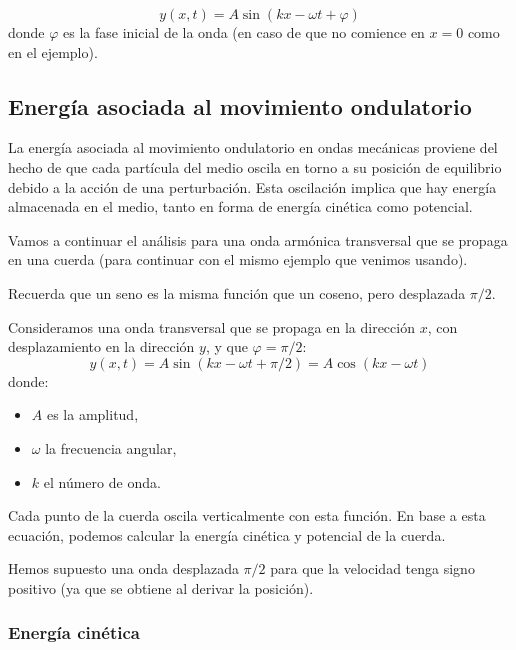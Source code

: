 \begin{equation}
  \boxed{y(x,t) = A \sin(kx - \omega t + \varphi)}
\end{equation}
donde \(\varphi\) es la fase inicial de la onda (en caso de que no comience en \(x=0\) como en el ejemplo).

\subsection{Energía asociada al movimiento ondulatorio}

La energía asociada al movimiento ondulatorio en ondas mecánicas proviene del hecho de que cada partícula del medio oscila en torno a su posición de equilibrio debido a la acción de una perturbación. Esta oscilación implica que hay energía almacenada en el medio, tanto en forma de energía cinética como potencial.

Vamos a continuar el análisis para una onda armónica transversal que se propaga en una cuerda (para continuar con el mismo ejemplo que venimos usando). 

\begin{tcolorbox}[myconclusion]
  Recuerda que un seno es la misma función que un coseno, pero desplazada \(\pi/2\).
\end{tcolorbox}

Consideramos una onda transversal que se propaga en la dirección \(x\), con desplazamiento en la dirección \(y\), y que \(\varphi = \pi/2\):
\[
y(x,t) = A \sin(kx - \omega t + \pi/2) = \boxed{A \cos(kx - \omega t)}
\]
donde:
\begin{itemize}
  \item \(A\) es la amplitud,
  \item \(\omega\) la frecuencia angular,
  \item \(k\) el número de onda.
\end{itemize}

Cada punto de la cuerda oscila verticalmente con esta función. En base a esta ecuación, podemos calcular la energía cinética y potencial de la cuerda.

\begin{tcolorbox}[myconclusion]
  Hemos supuesto una onda desplazada \(\pi/2\) para que la velocidad tenga signo positivo (ya que se obtiene al derivar la posición).
\end{tcolorbox}

\subsubsection{Energía cinética}

